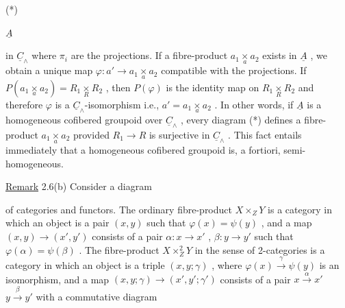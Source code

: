 (*) \qquad
{}
\qquad {} $\underline{A}$  \qquad
{}
in  $\underline{C}_\wedge$  where  $\pi_i$  are the projections. If a fibre-product  $a_1 \underset{a}{\times} a_2$  exists in  $\underline{A}$ , we obtain a unique map  $\varphi : a' \to a_1 \underset{a}{\times} a_2$  compatible with the projections. If  $P(a_1 \underset{a}{\times} a_2) = R_1 \underset{R}{\times} R_2$ , then  $P(\varphi)$  is the identity map on  $R_1 \underset{R}{\times} R_2$  and therefore  $\varphi$  is a  $\underline{C}_\wedge$-isomorphism i.e.,  $a' = a_1 \underset{a}{\times} a_2$ . In other words, if  $\underline{A}$  is a homogeneous cofibered groupoid over  $\underline{C}_\wedge$ , every  diagram (*) defines a fibre-product  $a_1 \underset{a}{\times} a_2$  provided  $R_1 \to R$  is surjective in  $\underline{C}_\wedge$ . This fact entails immediately
that a homogeneous cofibered groupoid is, a fortiori, semi-homogeneous.


\underline{Remark} 2.6(b)   Consider a diagram

\begin{center}
\end{center}
of categories and functors. The ordinary fibre-product  $X \times_Z Y$  is a category in which an object is a pair  $(x,y)$  such that  $\varphi(x) = \psi(y)$ , and a map $(x,y) \to (x', y')$  consists of a pair  $\alpha : x \to x'$ , $\beta : y \to y'$  such that $\varphi(\alpha) = \psi(\beta)$ . The fibre-product  $X \times^2_Z Y$  in the sense of  2-categories is a category in which an object is a triple  $(x,y; \gamma)$ , where  $\varphi(x) \xrightarrow{\gamma} \psi(y)$  is an isomorphism, and a map  $(x,y; \gamma) \to (x',y'; \gamma')$  consists of a pair  $x \xrightarrow{\alpha} x'$   $y \xrightarrow{\beta} y'$  with a commutative diagram

